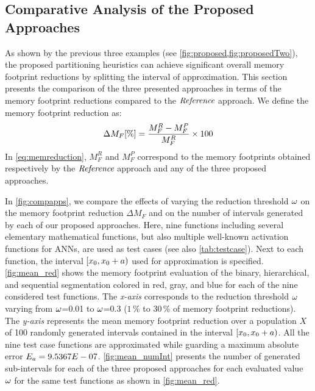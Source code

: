 \subsection{Comparative Analysis of the Proposed Approaches}\label{comp_prop_pre_impl}
As shown by the previous three examples (see \cref{fig:proposed,fig:proposedTwo}), the proposed partitioning heuristics can achieve significant overall memory footprint reductions by splitting the interval of approximation. 
This section presents the comparison of the three presented approaches in terms of the memory footprint reductions compared to the $\textit{Reference}$ approach.
We define the memory footprint reduction as:
\begin{equation}
\Delta M_{F} [\%] = \dfrac{M_F^R-M_F^P}{M_F^R}\times 100
\label{eq:memreduction}
\end{equation}
In \cref{eq:memreduction}, $M_F^R$ and $M_F^P$ correspond to the memory footprints obtained respectively by the $\textit{Reference}$ approach and any of the three proposed approaches.\par
In \cref{fig:compapps}, we compare the effects of varying the reduction threshold $\omega$ on the memory footprint reduction $\Delta M_F$ and on the number of intervals generated by each of our proposed approaches.
Here, nine functions including several elementary mathematical functions, but also multiple well-known activation functions for \acp{ANN}, are used as test cases (see also \cref{tab:testcase}).
Next to each function, the interval $[x_{0},x_{0}+a)$ used for approximation is specified.
\cref{fig:mean_red} shows the memory footprint evaluation of the binary, hierarchical, and sequential segmentation colored in red, gray, and blue for each of the nine considered test functions.
The \textit{x-axis} corresponds to the reduction threshold $\omega$ varying from $\omega$=0.01 to $\omega$=0.3 ($1\,\%$ to $30\,\%$ of memory footprint reductions).
The \textit{y-axis} represents the mean memory footprint reduction over a population $X$ of 100 randomly generated intervals contained in the interval $[x_{0}, x_{0}+a)$.
All the nine test case functions are approximated while guarding a maximum absolute error $E_a=9.5367E-07$.
\cref{fig:mean_numInt} presents the number of generated sub-intervals for each of the three proposed approaches for each evaluated value $\omega$ for the same test functions as shown in \cref{fig:mean_red}. \par
